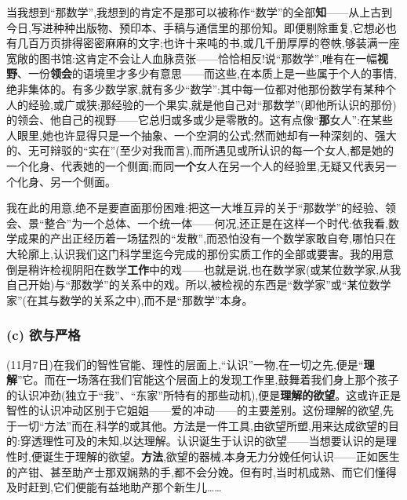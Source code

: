 当我想到“那数学”,我想到的肯定不是那可以被称作“数学”的全部\textbf{知}——从上古到今日,写进种种出版物、预印本、手稿与通信里的那份知。即便剔除重复,它想必也有几百万页排得密密麻麻的文字;也许十来吨的书,或几千册厚厚的卷帙,够装满一座宽敞的图书馆:这肯定不会让人血脉贲张——恰恰相反!说“那数学”,唯有在一幅\textbf{视野}、一份\textbf{领会}的语境里才多少有意思——而这些,在本质上是一些属于个人的事情,绝非集体的。有多少数学家,就有多少“数学”:其中每一位都对他那份数学有某种个人的经验,或广或狭;那经验的一个果实,就是他自己对“那数学”(即他所认识的那份)的领会、他自己的视野——它总归或多或少是零散的。这有点像“\textbf{那}女人”:在某些人眼里,她也许显得只是一个抽象、一个空洞的公式;然而她却有一种深刻的、强大的、无可辩驳的“实在”(至少对我而言),而所遇见或所认识的每一个女人\dmark{},都是她的一个化身、代表她的一个侧面;而同\textbf{一个}女人在另一个人的经验里,无疑又代表另一个化身、另一个侧面。

我在此的用意,绝不是要直面那份困难:把这一大堆互异的关于“那数学”的经验、领会、景“整合”为一个总体、一个统一体——何况,还正是在这样一个时代:依我看,数学成果的产出正经历着一场猛烈的“发散”,而恐怕没有一个数学家敢自夸,哪怕只在大轮廓上,认识我们这门科学里迄今完成的那份实质工作的全部或要害。我的用意倒是稍许检视阴阳在数学\textbf{工作}中的戏——也就是说,也在数学家(或某位数学家,从我自己开始)与“那数学”的关系中的戏。所以,被检视的东西是“数学家”或“某位数学家”(在其与数学的关系之中),而不是“那数学”本身。

\subsubsection*{(c) 欲与严格}
\label{ch18:local:h29}

\label{ch18:local:n25}

(11月7日)在我们的智性官能、理性的层面上,“认识”一物,在一切之先,便是“\textbf{理解}”它。而在一场落在我们官能这个层面上的发现工作里,鼓舞着我们身上那个孩子的认识冲劲(独立于“我”、“东家”所特有的那些动机),便是\textbf{理解的欲望}。这或许正是智性的认识冲动区别于它姐姐——爱的冲动——的主要差别。这份理解的欲望,先于一切“方法”而在,科学的或其他。方法是一件工具,由欲望所塑,用来达成欲望的目的:穿透理性可及的未知,以达理解。认识诞生于认识的欲望——当想要认识的是理性时,便诞生于理解的欲望。\textbf{方法},欲望的器械,本身无力分娩任何认识——正如医生的产钳、甚至助产士那双娴熟的手,都不会分娩。但有时,当时机成熟、而它们懂得及时赶到,它们便能有益地助产那个新生儿……


